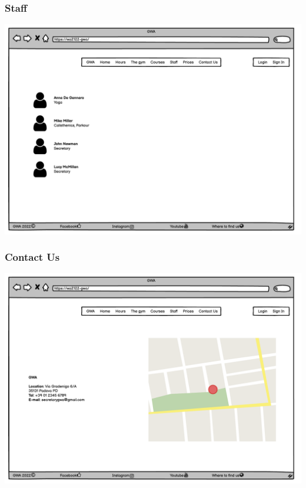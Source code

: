 \subsubsection{Staff}
\includegraphics[width=\columnwidth]{InterfaceMockup/staff.pdf}

\subsubsection{Contact Us}
\includegraphics[width=\columnwidth]{InterfaceMockup/contact_us.pdf}


